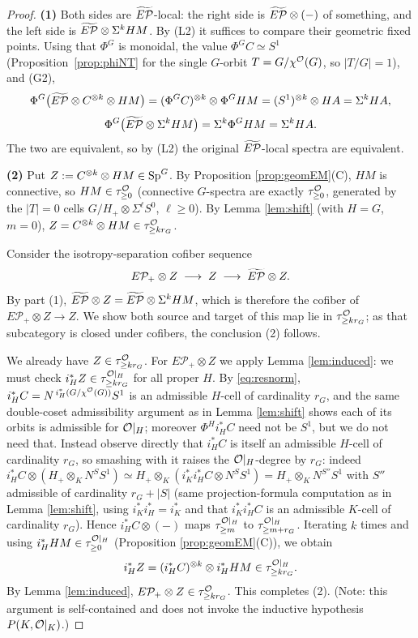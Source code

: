 \begin{proof}
\textbf{(1)} Both sides are $\widetilde{E\mathcal P}$-local: the right side is $\widetilde{E\mathcal P}\otimes(-)$ of
something, and the left side is $\widetilde{E\mathcal P}\otimes\Sigma^k HM$. By (L2) it suffices to
compare their geometric fixed points. Using that $\Phi^G$ is monoidal, the value
$\Phi^G C\simeq S^1$ (Proposition~\ref{prop:phiNT} for the single $G$-orbit
$T=G/\chi^{\mathcal{O}}(G)$, so $|T/G|=1$), and (G2),
\[
\Phi^G\bigl(\widetilde{E\mathcal P}\otimes C^{\otimes k}\otimes HM\bigr)
=(\Phi^G C)^{\otimes k}\otimes\Phi^G HM
=(S^1)^{\otimes k}\otimes HA=\Sigma^k HA ,
\]
\[
\Phi^G\bigl(\widetilde{E\mathcal P}\otimes\Sigma^k HM\bigr)=\Sigma^k\Phi^G HM=\Sigma^k HA .
\]
The two are equivalent, so by (L2) the original $\widetilde{E\mathcal P}$-local spectra are
equivalent.

\textbf{(2)} Put $Z:=C^{\otimes k}\otimes HM\in\mathrm{Sp}^G$. By Proposition
\ref{prop:geomEM}(C), $HM$ is connective, so $HM\in\tau^{\mathcal{O}}_{\ge 0}$ (connective
$G$-spectra are exactly $\tau^{\mathcal{O}}_{\ge 0}$, generated by the $|T|=0$ cells
$G/H_+\otimes\Sigma^\ell S^0$, $\ell\ge 0$). By Lemma \ref{lem:shift} (with $H=G$,
$m=0$), $Z=C^{\otimes k}\otimes HM\in\tau^{\mathcal{O}}_{\ge k r_G}$.

Consider the isotropy-separation cofiber sequence
\[
E\mathcal P_+\otimes Z\;\longrightarrow\; Z\;\longrightarrow\;\widetilde{E\mathcal P}\otimes Z .
\]
By part (1), $\widetilde{E\mathcal P}\otimes Z=\widetilde{E\mathcal P}\otimes\Sigma^k HM$, which is therefore the cofiber
of $E\mathcal P_+\otimes Z\to Z$. We show both source and target of this map lie
in $\tau^{\mathcal{O}}_{\ge k r_G}$; as that subcategory is closed under cofibers, the
conclusion (2) follows.

We already have $Z\in\tau^{\mathcal{O}}_{\ge k r_G}$. For $E\mathcal P_+\otimes Z$ we apply
Lemma \ref{lem:induced}: we must check $i_H^\ast Z\in\tau^{\mathcal{O}|_H}_{\ge k r_G}$ for
all proper $H$. By \eqref{eq:resnorm}, $i_H^\ast C=N^{\,i_H^\ast(G/\chi^{\mathcal{O}}(G))}S^1$
is an admissible $H$-cell of cardinality $r_G$, and the same double-coset
admissibility argument as in Lemma \ref{lem:shift} shows each of its orbits is
admissible for $\mathcal{O}|_H$; moreover $\Phi^H i_H^\ast C$ need not be $S^1$, but we do
not need that. Instead observe directly that $i_H^\ast C$ is itself an admissible
$H$-cell of cardinality $r_G$, so smashing with it raises the $\mathcal{O}|_H$-degree by
$r_G$: indeed $i_H^\ast C\otimes(H_+\otimes_K N^S S^1)\simeq
H_+\otimes_K(i_K^\ast i_H^\ast C\otimes N^S S^1)=H_+\otimes_K N^{S''}S^1$ with $S''$
admissible of cardinality $r_G+|S|$ (same projection-formula computation as in
Lemma \ref{lem:shift}, using $i_K^\ast i_H^\ast=i_K^\ast$ and that
$i_K^\ast i_H^\ast C$ is an admissible $K$-cell of cardinality $r_G$). Hence
$i_H^\ast C\otimes(-)$ maps $\tau^{\mathcal{O}|_H}_{\ge m}$ to $\tau^{\mathcal{O}|_H}_{\ge m+r_G}$.
Iterating $k$ times and using $i_H^\ast HM\in\tau^{\mathcal{O}|_H}_{\ge 0}$
(Proposition \ref{prop:geomEM}(C)), we obtain
\[
i_H^\ast Z=(i_H^\ast C)^{\otimes k}\otimes i_H^\ast HM\in\tau^{\mathcal{O}|_H}_{\ge k r_G}.
\]
By Lemma \ref{lem:induced}, $E\mathcal P_+\otimes Z\in\tau^{\mathcal{O}}_{\ge k r_G}$. This
completes (2). (Note: this argument is self-contained and does not invoke the
inductive hypothesis $P(K,\mathcal{O}|_K)$.)


\end{proof}

